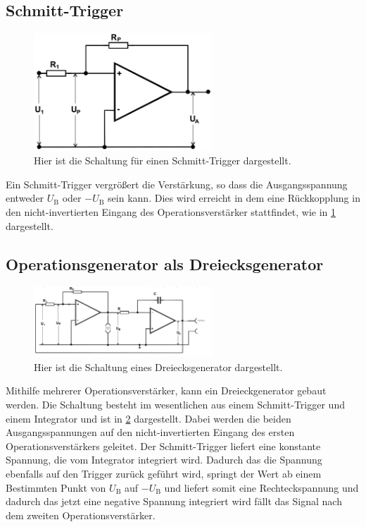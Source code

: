 \subsection{Schmitt-Trigger}
\begin{figure}[h!]
	\centering
	\includegraphics[width = 0.6\textwidth]{../Grafiken/Schmitt-Trigger.png}
	\caption{Hier ist die Schaltung für einen Schmitt-Trigger dargestellt. \cite{V51}\label{fig:Schmitt-Trigger}}
\end{figure}
Ein Schmitt-Trigger vergrößert die Verstärkung, so dass die Ausgangsspannung entweder $U_\text{B}$ oder $-U_\text{B}$ sein kann.
Dies wird erreicht in dem eine Rückkopplung in den nicht-invertierten Eingang des Operationsverstärker stattfindet, wie in \cref{fig:Schmitt-Trigger} dargestellt.
\newpage
\subsection{Operationsgenerator als Dreiecksgenerator}
\begin{figure}[h!]
	\centering
	\includegraphics[width = 0.6\textwidth]{../Grafiken/Dreieckgenerator.png}
	\caption{Hier ist die Schaltung eines Dreiecksgenerator dargestellt. \cite{V51} \label{fig:Dreieck}}
\end{figure}
Mithilfe mehrerer Operationsverstärker, kann ein Dreieckgenerator gebaut werden.
Die Schaltung besteht im wesentlichen aus einem Schmitt-Trigger und einem Integrator und ist in \cref{fig:Dreieck} dargestellt.
Dabei werden die beiden Ausgangsspannungen auf den nicht-invertierten Eingang des ersten Operationsverstärkers geleitet.
Der Schmitt-Trigger liefert eine konstante Spannung, die vom Integrator integriert wird.
Dadurch das die Spannung ebenfalls auf den Trigger zurück geführt wird, springt der Wert ab einem Bestimmten Punkt von $U_\text{B}$ auf $-U_\text{B}$ und liefert somit eine Rechteckspannung und dadurch das jetzt eine negative Spannung integriert wird fällt das Signal nach dem zweiten Operationsverstärker.
\newpage